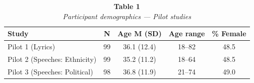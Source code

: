 \begin{table}
\caption*{
{\large \textbf{Table 1}} \\ 
{\small \emph{Participant demographics --- Pilot studies}}
} 
\fontsize{9.0pt}{10.8pt}\selectfont
\begin{tabular*}{\linewidth}{@{\extracolsep{\fill}}lcccc}
\toprule
Study & N & Age M (SD) & Age range & \% Female \\ 
\midrule\addlinespace[2.5pt]
Pilot 1 (Lyrics) & 99 & 36.1 (12.4) & 18–82 & 48.5 \\ 
Pilot 2 (Speeches: Ethnicity) & 99 & 35.2 (11.2) & 18–64 & 48.5 \\ 
Pilot 3 (Speeches: Political) & 98 & 36.8 (11.9) & 21–74 & 49.0 \\ 
\bottomrule
\end{tabular*}
\end{table}

